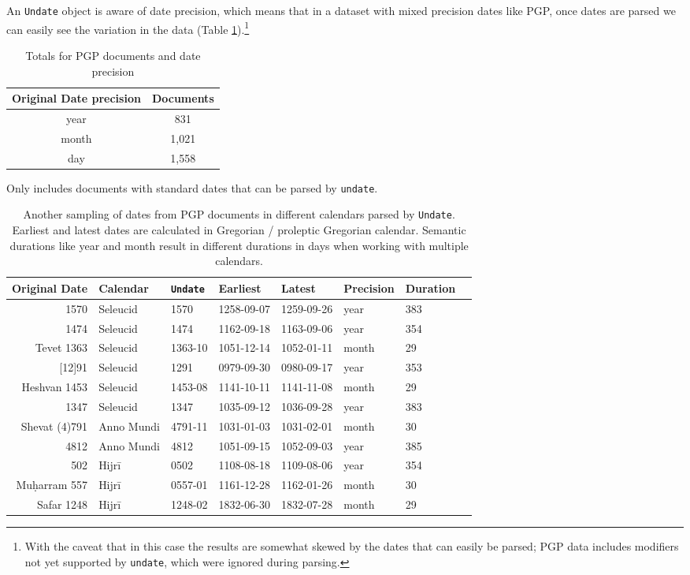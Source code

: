 \documentclass[final]{anthology-ch} %
\begin{document}
An \texttt{Undate} object is aware of date precision, which means that in a dataset with mixed precision dates like PGP, once dates are parsed we can easily see the variation in the data (Table \ref{tab:pgp-date-precisions}).\footnote{With the caveat that in this case the results are somewhat skewed by the dates that can easily be parsed; PGP data includes modifiers not yet supported by \texttt{undate}, which were ignored during parsing.}

\begin{table}[h]
  \centering 
  \begin{tabular}{cc}
    \toprule
    Original Date precision & Documents \\ 
    \midrule
    year & 831 \\
    month & 1,021 \\
    day & 1,558 \\
    \bottomrule
  \end{tabular}
  \caption{Totals for PGP documents and date precision}
    \medskip
    \small
    Only includes documents with standard dates that can be parsed by \texttt{undate}.
  \label{tab:pgp-date-precisions}
\end{table}

\begin{table}[h]
  \centering 
  \begin{tabular}{rlllllll}
    \toprule
Original Date & Calendar & \texttt{Undate} & Earliest & Latest & Precision & Duration \\ 
\midrule
1570 & Seleucid & 1570 & 1258-09-07 & 1259-09-26 & year & 383 \\
1474 & Seleucid & 1474 & 1162-09-18 & 1163-09-06 & year & 354 \\
Tevet 1363 & Seleucid & 1363-10 & 1051-12-14 & 1052-01-11 & month & 29 \\
{[12]91} & Seleucid & 1291 & 0979-09-30 & 0980-09-17 & year & 353 \\
Heshvan 1453 & Seleucid & 1453-08 & 1141-10-11 & 1141-11-08 & month & 29 \\
1347 & Seleucid & 1347 & 1035-09-12 & 1036-09-28 & year &  383 \\
\midrule
Shevat (4)791 & Anno Mundi & 4791-11 & 1031-01-03 & 1031-02-01 & month & 30 \\
4812 & Anno Mundi & 4812 & 1051-09-15 & 1052-09-03 & year & 385 \\
\midrule
502 & Hijrī & 0502 & 1108-08-18 & 1109-08-06 & year & 354 \\
Muḥarram 557 & Hijrī & 0557-01 & 1161-12-28 & 1162-01-26 & month & 30 \\
Safar 1248 & Hijrī & 1248-02 & 1832-06-30 & 1832-07-28 & month & 29 \\
\bottomrule
    \bottomrule
  \end{tabular}
  \caption{Another sampling of dates from PGP documents in different calendars parsed by \texttt{Undate}. Earliest and latest dates are calculated in Gregorian / proleptic Gregorian calendar. Semantic durations like year and month result in different durations in days when working with multiple calendars.}
  \label{tab:pgp-date-durations}
\end{table}
\end{document}
